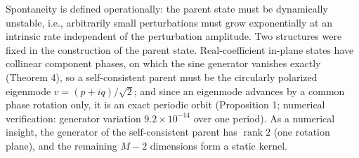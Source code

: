 \documentclass[
  a4paper,
]{article}
\begin{document}
Spontaneity is defined operationally: the parent state must be
dynamically unstable, i.e., arbitrarily small perturbations must grow
exponentially at an intrinsic rate independent of the perturbation
amplitude. Two structures were fixed in the construction of the parent
state. Real-coefficient in-plane states have collinear component phases,
on which the sine generator vanishes exactly (Theorem 4), so a
self-consistent parent must be the circularly polarized eigenmode
\(v=(p+iq)/\sqrt2\); and since an eigenmode advances by a common phase
rotation only, it is an exact periodic orbit (Proposition 1; numerical
verification: generator variation \(9.2\times10^{-14}\) over one
period). As a numerical insight, the generator of the self-consistent
parent has \(\operatorname{rank}2\) (one rotation plane), and the
remaining \(M-2\) dimensions form a static kernel.
\end{document}
